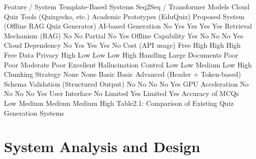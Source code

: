 \documentclass[12pt,a4paper]{report}
\begin{document}
Feature / System
Template-Based Systems
Seq2Seq / Transformer Models
Cloud Quiz Tools (Quizgecko, etc.)
Academic Prototypes (EduQuiz)
Proposed System (Offline RAG Quiz Generator)
AI-based Generation
No
Yes
Yes
Yes
Yes
Retrieval Mechanism (RAG)
No
No
Partial
No
Yes
Offline Capability
Yes
No
No
No
Yes
Cloud Dependency
No
Yes
Yes
Yes
No
Cost (API usage)
Free
High
High
High
Free
Data Privacy
High
Low
Low
Low
High
Handling Large Documents
Poor
Poor
Moderate
Poor
Excellent
Hallucination Control
Low
Low
Medium
Low
High
Chunking Strategy
None
None
Basic
Basic
Advanced (Header + Token-based)
Schema Validation (Structured Output)
No
No
No
No
Yes
GPU Acceleration
No
No
No
No
Yes
User Interface
No
Limited
Yes
Limited
Yes
Accuracy of MCQs
Low
Medium
Medium
Medium
High
Table2.1: Comparison of Existing Quiz Generation Systems












































\chapter{System Analysis and Design}
\end{document}
